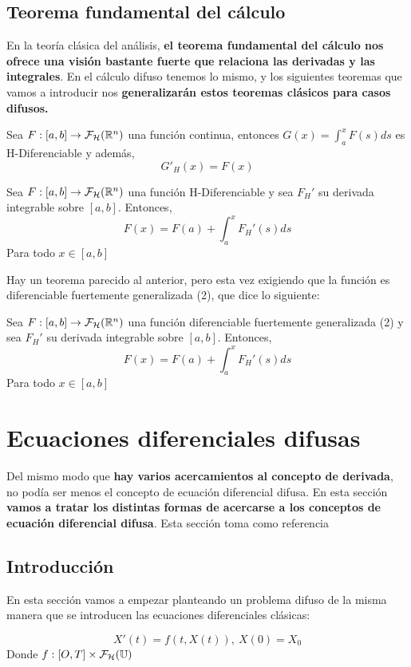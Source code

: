 \subsection{Teorema fundamental del cálculo}
En la teoría clásica del análisis, \textbf{el teorema fundamental del cálculo nos ofrece una visión bastante fuerte que relaciona las derivadas y las integrales}. En el cálculo difuso tenemos lo mismo, y los siguientes teoremas que vamos a introducir nos \textbf{generalizarán estos teoremas clásicos para casos difusos.}

\begin{teorema}
	Sea $F : [a, b] \rightarrow \mathcal{F}_\mathcal{H} (\mathbb R^n)$ una función continua, entonces $G(x) = \int_{a}^{x} F(s) ds$ es H-Diferenciable y además,
	\[
		G'_H(x) = F(x)
	\]
\end{teorema}

\begin{teorema}
	Sea $F : [a, b] \rightarrow  \mathcal{F}_\mathcal{H} (\mathbb R^n)$ una función H-Diferenciable y sea $F_H'$ su derivada integrable sobre $[a, b]$. Entonces,
	\[
		F(x) = F(a) + \int_{a}^{x}F_H'(s) ds
	\]
	Para todo $x \in [a, b]$
\end{teorema}

Hay un teorema parecido al anterior, pero esta vez exigiendo que la función es diferenciable fuertemente generalizada (2), que dice lo siguiente:

\begin{teorema}
	Sea $F : [a, b] \rightarrow  \mathcal{F}_\mathcal{H} (\mathbb R^n)$ una función diferenciable fuertemente generalizada (2) y sea $F_H'$ su derivada integrable sobre $[a, b]$. Entonces,
	\[
	F(x) = F(a) + \int_{a}^{x}F_H'(s) ds
	\]
	Para todo $x \in [a, b]$
\end{teorema}

\section{Ecuaciones diferenciales difusas}
Del mismo modo que \textbf{hay varios acercamientos al concepto de derivada}, no podía ser menos el concepto de ecuación diferencial difusa. En esta sección \textbf{vamos a tratar los distintas formas de acercarse a los conceptos de ecuación diferencial difusa}. Esta sección toma como referencia \cite{fuzzyapproaches}

\subsection{Introducción}
En esta sección vamos a empezar planteando un problema difuso de la misma manera que se introducen las ecuaciones diferenciales clásicas:

\begin{equation}
	\label{def:edf}
	X'(t) = f(t, X(t)), ~ X(0) = X_0
\end{equation}
Donde $f : [O, T] \times \mathcal{F}_\mathcal{H}(\mathbb U)$